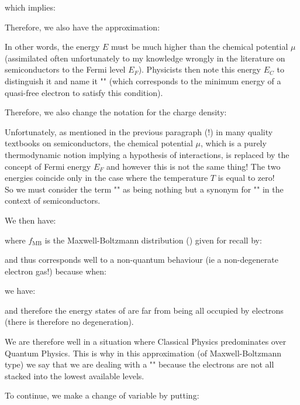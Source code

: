 	which implies:
	
	Therefore, we also have the approximation:
	
	In other words, the energy $E$ must be much higher than the chemical potential $\mu$ (assimilated often unfortunately to my knowledge wrongly in the literature on semiconductors to the Fermi level $E_F$). Physicists then note this energy $E_C$ to distinguish it and name it "" (which corresponds to the minimum energy of a quasi-free electron to satisfy this condition).

	Therefore, we also change the notation for the charge density:
	
	\begin{tcolorbox}[title=Remark,colframe=black,arc=10pt]
	Unfortunately, as mentioned in the previous paragraph (!) in many quality textbooks on semiconductors, the chemical potential $\mu$, which is a purely thermodynamic notion implying a hypothesis of interactions, is replaced by the concept of Fermi energy $E_F$ and however this is not the same thing! The two energies coincide only in the case where the temperature $T$ is equal to zero!\\

	So we must consider the term "" as being nothing but a synonym for "" in the context of semiconductors.
	\end{tcolorbox}
	We then have:
	
	where $f_{\text{MB}}$ is the Maxwell-Boltzmann distribution () given for recall by:
	
	and thus corresponds well to a non-quantum behaviour (ie a non-degenerate electron gas!) because when:
	
	we have:
	
	and therefore the energy states of are far from being all occupied by electrons (there is therefore no degeneration).

	We are therefore well in a situation where Classical Physics predominates over Quantum Physics. This is why in this approximation (of Maxwell-Boltzmann type) we say that we are dealing with a "" because the electrons are not all stacked into the lowest available levels.

	To continue, we make a change of variable by putting:
	
